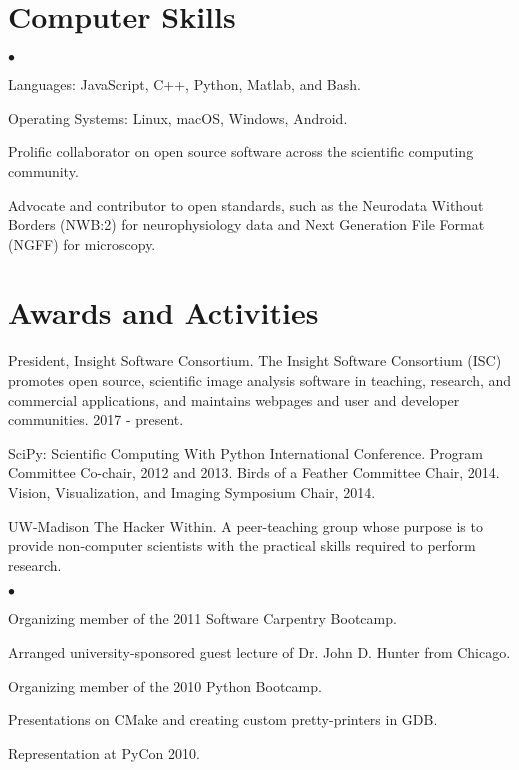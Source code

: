 \documentclass[margin,line]{res}
\newenvironment{list2}{
  \begin{list}{$\bullet$}{%
      \setlength{\itemsep}{0in}
      \setlength{\parsep}{0in} \setlength{\parskip}{0in}
      \setlength{\topsep}{0in} \setlength{\partopsep}{0in}
      \setlength{\leftmargin}{0.2in}}}{\end{list}}
\begin{document}
\begin{resume}
%
%
%
%

%
\section{\sc Computer Skills}
\begin{list2}
\item Languages: JavaScript, C++, Python, Matlab, and Bash.
\item Operating Systems: Linux, macOS, Windows, Android.
\item Prolific collaborator on open source software across the scientific computing community.
\item Advocate and contributor to open standards, such as the Neurodata
  Without Borders (NWB:2) for neurophysiology data and Next Generation File Format (NGFF) for microscopy.
\end{list2}

\section{\sc Awards and Activities}

President, Insight Software Consortium.
The Insight Software Consortium (ISC) promotes open source, scientific image analysis software in teaching, research, and commercial applications, and maintains webpages and user and developer communities.
2017 - present.

SciPy: Scientific Computing With Python International Conference.  Program
Committee Co-chair, 2012 and 2013. Birds of a Feather Committee Chair, 2014.
Vision, Visualization, and Imaging Symposium Chair, 2014.

UW-Madison The Hacker Within.  A peer-teaching group whose purpose is to provide
non-computer scientists with the practical skills required to perform research.
\begin{list2}
\item Organizing member of the 2011 Software Carpentry Bootcamp.
\item Arranged university-sponsored guest lecture of Dr. John D. Hunter from Chicago.
\item Organizing member of the 2010 Python Bootcamp.
\item Presentations on CMake and creating custom pretty-printers in GDB.
\item Representation at PyCon 2010.
\end{list2}


\end{resume}
\end{document}
